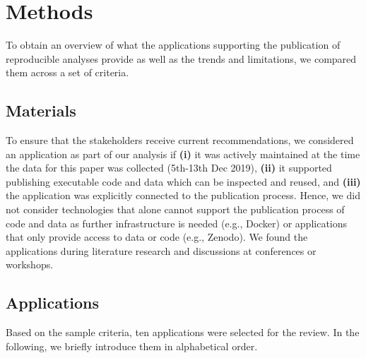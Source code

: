 \documentclass[onecolumn]{article}
\begin{document}
\hypertarget{methods}{%
\section{Methods}\label{methods}}

To obtain an overview of what the applications supporting the
publication of reproducible analyses provide as well as the trends and
limitations, we compared them across a set of criteria.

\hypertarget{materials}{%
\subsection{Materials}\label{materials}}

To ensure that the stakeholders receive current recommendations, we
considered an application as part of our analysis if \textbf{(i)} it was
actively maintained at the time the data for this paper was collected
(5th-13th Dec 2019), \textbf{(ii)} it supported publishing executable
code and data which can be inspected and reused, and \textbf{(iii)} the
application was explicitly connected to the publication process. Hence,
we did not consider technologies that alone cannot support the
publication process of code and data as further infrastructure is needed
(e.g., Docker) or applications that only provide access to data or code
(e.g., Zenodo). We found the applications during literature research and
discussions at conferences or workshops.

\hypertarget{applications}{%
\subsection{Applications}\label{applications}}

Based on the sample criteria, ten applications were selected for the
review. In the following, we briefly introduce them in alphabetical
order.
\end{document}
